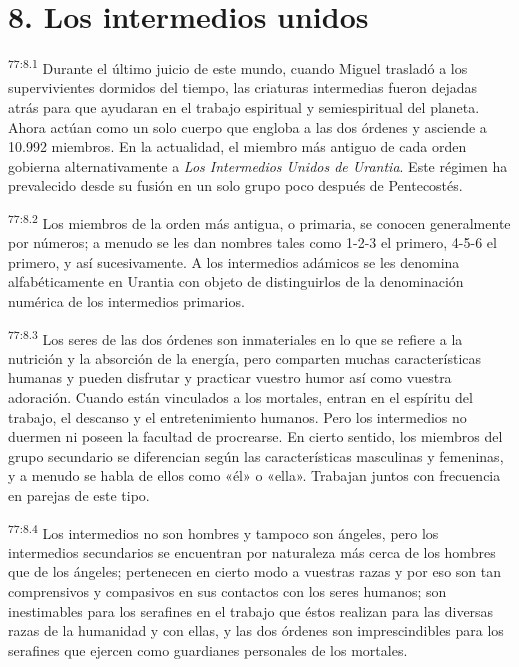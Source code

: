 \section*{8. Los intermedios unidos}
\par
\textsuperscript{77:8.1} Durante el último juicio de este mundo, cuando Miguel trasladó a los supervivientes dormidos del tiempo, las criaturas intermedias fueron dejadas atrás para que ayudaran en el trabajo espiritual y semiespiritual del planeta. Ahora actúan como un solo cuerpo que engloba a las dos órdenes y asciende a 10.992 miembros. En la actualidad, el miembro más antiguo de cada orden gobierna alternativamente a \textit{Los Intermedios Unidos de Urantia}. Este régimen ha prevalecido desde su fusión en un solo grupo poco después de Pentecostés.

\par
\textsuperscript{77:8.2} Los miembros de la orden más antigua, o primaria, se conocen generalmente por números; a menudo se les dan nombres tales como 1-2-3 el primero, 4-5-6 el primero, y así sucesivamente. A los intermedios adámicos se les denomina alfabéticamente en Urantia con objeto de distinguirlos de la denominación numérica de los intermedios primarios.

\par
\textsuperscript{77:8.3} Los seres de las dos órdenes son inmateriales en lo que se refiere a la nutrición y la absorción de la energía, pero comparten muchas características humanas y pueden disfrutar y practicar vuestro humor así como vuestra adoración. Cuando están vinculados a los mortales, entran en el espíritu del trabajo, el descanso y el entretenimiento humanos. Pero los intermedios no duermen ni poseen la facultad de procrearse. En cierto sentido, los miembros del grupo secundario se diferencian según las características masculinas y femeninas, y a menudo se habla de ellos como «él» o «ella». Trabajan juntos con frecuencia en parejas de este tipo.

\par
\textsuperscript{77:8.4} Los intermedios no son hombres y tampoco son ángeles, pero los intermedios secundarios se encuentran por naturaleza más cerca de los hombres que de los ángeles; pertenecen en cierto modo a vuestras razas y por eso son tan comprensivos y compasivos en sus contactos con los seres humanos; son inestimables para los serafines en el trabajo que éstos realizan para las diversas razas de la humanidad y con ellas, y las dos órdenes son imprescindibles para los serafines que ejercen como guardianes personales de los mortales.

